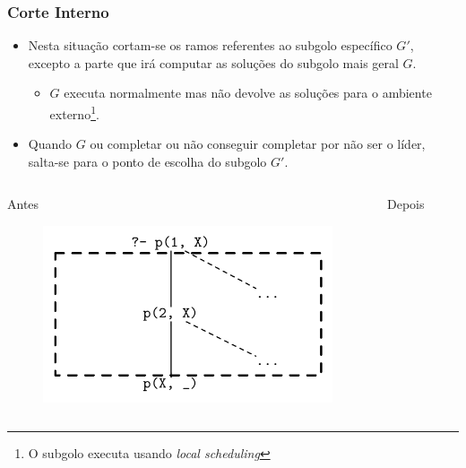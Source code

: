 \documentclass{beamer}
\begin{document}
\begin{frame}
   \frametitle{Corte Interno}
   \begin{itemize}
      \item Nesta situação cortam-se os ramos referentes ao subgolo específico $G'$, excepto a parte que irá
      computar as soluções do subgolo mais geral $G$.
      \begin{itemize}
         \item $G$ executa normalmente mas não devolve as soluções para o ambiente externo\footnote{O subgolo
         executa usando \emph{local scheduling}}.
      \end{itemize}
      \item<2-> Quando $G$ ou completar ou não conseguir completar por não ser o líder, salta-se para o ponto
      de escolha do subgolo $G'$.
   \end{itemize}
   \begin{columns}[t]
         \begin{block}{Antes}
           \begin{figure}[ht]
             \centering
               \includegraphics[scale=0.4]{internal1.pdf}
           \end{figure}
         \end{block}
         \pause
         \begin{block}{Depois}
           \begin{figure}[ht]
             \centering

\end{figure}
\end{block}
\end{columns}
\end{frame}
\end{document}
